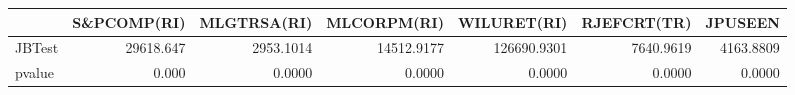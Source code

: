 \begin{tabular}{lrrrrrr}
\toprule
{} &  S\&PCOMP(RI) &  MLGTRSA(RI) &  MLCORPM(RI) &  WILURET(RI) &  RJEFCRT(TR) &    JPUSEEN \\
\midrule
JBTest &    29618.647 &    2953.1014 &   14512.9177 &  126690.9301 &    7640.9619 &  4163.8809 \\
pvalue &        0.000 &       0.0000 &       0.0000 &       0.0000 &       0.0000 &     0.0000 \\
\bottomrule
\end{tabular}
